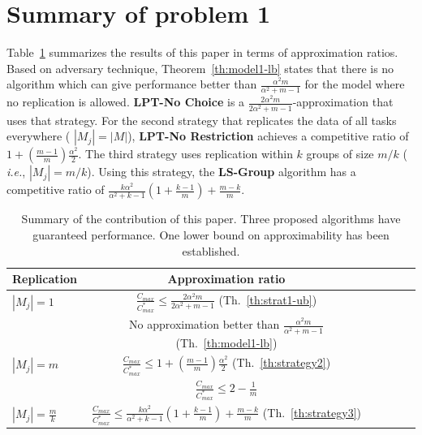 \documentclass[twocolumn]{svjour3}
\begin{document}
\section{Summary of problem 1}\label{sec7}
Table~\ref{tab:template} summarizes the results of this paper in terms
of approximation ratios. Based on adversary technique,
Theorem~\ref{th:model1-lb} states that there is no algorithm which can
give performance better than $\frac{\alpha^{2}m }{\alpha^{2} + m-1}$ for the model where no
replication is allowed. {\bf LPT-No Choice} is a
$\frac{2\alpha^{2}m}{2\alpha^{2}+ m-1}$-approximation that uses that
strategy. For the second strategy that replicates the data of all
tasks everywhere ( $|M_j| = |M|$), {\bf LPT-No Restriction} achieves a
competitive ratio of $1 + (\frac{m-1}{m})\frac{\alpha^{2}}{2}$.  The
third strategy uses replication within $k$ groups of size $m/k$ ({\em
  i.e.}, $|M_j| = m/k$). Using this strategy, the {\bf LS-Group}
algorithm has a competitive ratio of
$\frac{k\alpha^{2}}{\alpha^{2}+k-1}\left( 1+ {\frac{k-1}{m}} \right) +
{\frac{m-k}{m}}$.



\begin{table}[ht]
  \centering
  \begin{tabular}{|l|c|c|c|c|c|}
    \hline
    Replication & Approximation ratio  \\
    \hline
    $|M_j|=1$ & $\frac{C_{max}}{C_{max}^{*}}\leq \frac{2\alpha^{2}m}{2\alpha^{2}+ m-1}$ (Th.~\ref{th:strat1-ub})  \\
    & No approximation better than $\frac{\alpha^{2}m }{\alpha^{2} + m-1}$ (Th.~\ref{th:model1-lb})   \\
    
    \hline
    $|M_j|=m$ & $\frac{C_{max}}{C_{max}^{*}} \leq 1 + (\frac{m-1}{m})\frac{\alpha^{2}}{2}$ (Th.~\ref{th:strategy2})  \\
    & $\frac{C_{max}}{C_{max}^{*}} \leq 2-\frac{1}{m}$ \cite{Graham66}   \\
    \hline
    
    $|M_j|= \frac{m}{k} $ & $\frac{C_{max}}{C_{max}^{*}} \leq \frac{k\alpha^{2}}{\alpha^{2}+k-1} \left(1+ {\frac{k-1}{m}} \right)+ {\frac{m-k}{m}}$ (Th.~\ref{th:strategy3})  \\
    
    \hline
  \end{tabular}
  \caption{Summary of the contribution of this paper.
    Three proposed algorithms have guaranteed performance.
    One lower bound on approximability has been established.}
  \label{tab:template}
\end{table}
\end{document}
